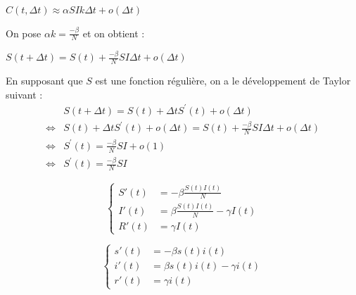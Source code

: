 \documentclass{beamer}
\theoremstyle{plain}
\theoremstyle{definition}
\theoremstyle{remark}
\begin{document}
\begin{frame}
\begin{center}
    $C(t, \Delta t) \approx \alpha SIk \Delta t +  o(\Delta t)$
\end{center}
On pose $\alpha k = \frac{- \beta}{N}$ et on obtient : 
\begin{center}
    $S(t+\Delta t) = S(t) + \frac{- \beta}{N}SI\Delta t + o(\Delta t)$
\end{center}
En supposant que $S$ est une fonction régulière, on a le développement de Taylor suivant :
\begin{align*}
    &S(t + \Delta t) =  S(t) + \Delta t  S^{'}(t)+o(\Delta t)\\
    \Leftrightarrow &S(t) + \Delta t S^{'}(t) + o(\Delta t)= S(t) + \frac{- \beta}{N}SI\Delta t + o(\Delta t)\\
    \Leftrightarrow &S^{'}(t) = \frac{- \beta}{N}SI + o(1)\\
    \Leftrightarrow &S^{'}(t) = \frac{- \beta}{N}SI 
\end{align*}
    

\end{frame}

\begin{frame}
\begin{equation*}
\left\{
\begin{aligned}
S'(t)&= -\beta\frac{S(t)I(t)}{N} \\
I'(t)&= \beta\frac{S(t)I(t)}{N} - \gamma I(t) \\
R'(t)&= \gamma I(t)
\end{aligned}
 \right.
\end{equation*}
\end{frame}
\begin{frame}
\begin{equation*}
\left\{
\begin{aligned}
s'(t)&= -\beta s(t)i(t)\\
i'(t)&= \beta s(t)i(t) - \gamma i(t) \\
r'(t)&= \gamma i(t)
\end{aligned}
 \right.
\end{equation*}
\end{frame}
\end{document}

